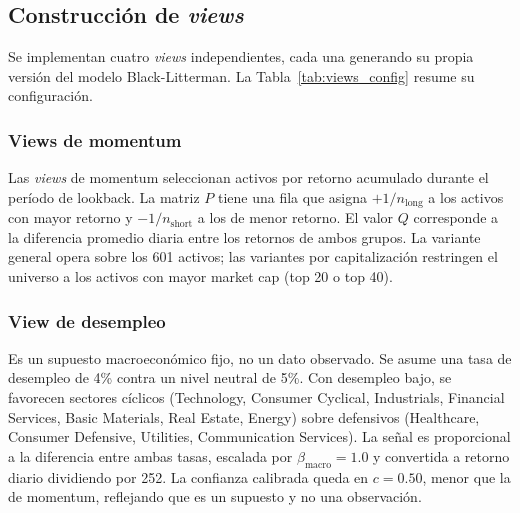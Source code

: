 \subsection{Construcci\'on de \textit{views}}

Se implementan cuatro \textit{views} independientes, cada una generando su
propia versi\'on del modelo Black-Litterman. La
Tabla~\ref{tab:views_config} resume su configuraci\'on.

\begin{table}[h]
\centering
\caption{Configuración de las cuatro variantes de \textit{views} Black-Litterman.}
\label{tab:views_config}
\scriptsize
\setlength{\tabcolsep}{4pt}
\renewcommand{\arraystretch}{0.9}
\end{table}


\subsubsection{Views de momentum}

Las \textit{views} de momentum seleccionan activos por retorno acumulado
durante el per\'iodo de lookback. La matriz $P$ tiene una fila que asigna
$+1/n_{\text{long}}$ a los activos con mayor retorno y
$-1/n_{\text{short}}$ a los de menor retorno. El valor $Q$ corresponde a la
diferencia promedio diaria entre los retornos de ambos grupos. La variante
general opera sobre los 601 activos; las variantes por capitalizaci\'on
restringen el universo a los activos con mayor market cap (top 20 o top 40).

\subsubsection{View de desempleo}

Es un supuesto macroecon\'omico fijo, no un dato observado. Se asume una
tasa de desempleo de 4\% contra un nivel neutral de 5\%. Con desempleo bajo,
se favorecen sectores c\'iclicos (Technology, Consumer Cyclical, Industrials,
Financial Services, Basic Materials, Real Estate, Energy) sobre defensivos
(Healthcare, Consumer Defensive, Utilities, Communication Services). La
se\~nal es proporcional a la diferencia entre ambas tasas, escalada por
$\beta_{\text{macro}} = 1.0$ y convertida a retorno diario dividiendo por
252. La confianza calibrada queda en $c = 0.50$, menor que la de momentum, reflejando
que es un supuesto y no una observaci\'on.


